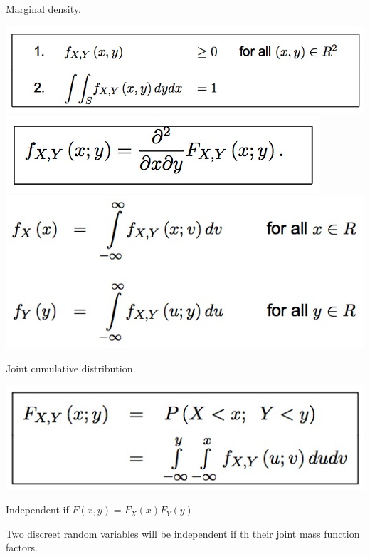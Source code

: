 \documentclass{/out/app/latex/examnotes}
\begin{document}
{

Marginal density.

\includegraphics[scale=0.4]{./img/3con1.jpg}                                         
\includegraphics[scale=0.4]{./img/3con2.jpg}                                         
\includegraphics[scale=0.4]{./img/3con3.jpg}                                         


Joint cumulative distribution.

\includegraphics[scale=0.4]{./img/3con4.jpg}                                         


Independent if $F(x,y)=F_X(x)F_Y(y)$

Two discreet random variables will be independent if th their joint mass function factors.

}
\end{document}
